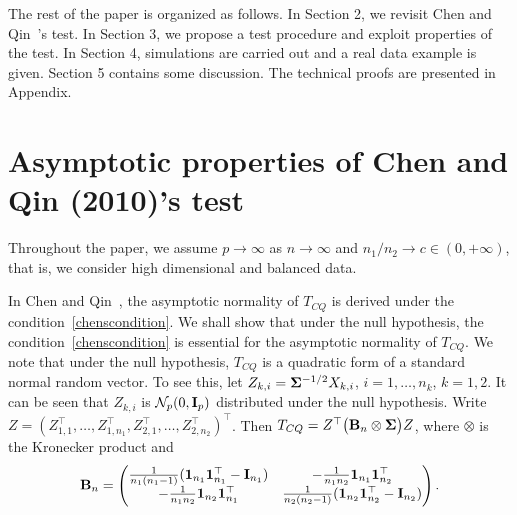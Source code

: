 \documentclass[times,sort&compress,3p]{elsarticle}
\theoremstyle{plain}
\theoremstyle{definition}
\theoremstyle{remark}
\begin{document}
The rest of the paper is organized as follows. In Section 2,  we revisit Chen and Qin~\cite{Chen2010A}'s test.  In Section 3, we propose a test procedure and exploit properties of the test.  In Section 4, simulations are carried out and  a real data example is given. Section 5 contains some discussion. The technical proofs are presented in Appendix.

\section{Asymptotic properties of Chen and Qin (2010)'s test}\label{sec:chen}
    Throughout the paper, we  assume $p\to \infty$ as $n\to \infty$ and ${n_1}/{n_2}\to c \in (0,+\infty)$, that is, we consider high dimensional and balanced data.


    In Chen and Qin~\cite{Chen2010A}, the asymptotic normality of $T_{CQ}$ is derived under the condition~\eqref{chenscondition}.
    We shall show that under the null hypothesis, the condition~\eqref{chenscondition} is essential for the asymptotic normality of $T_{CQ}$.
We note that under the null hypothesis, $T_{CQ}$ is a quadratic form of a standard normal random vector.
To see this,
let $Z_{k,i}=\boldsymbol{\Sigma}^{-1/2}X_{k,i}$, $i=1,\ldots,n_k$, $k=1,2$.
It can be seen that $Z_{k,i}$ is $ \mathcal{N}_p(0,\mathbf{I}_{p})$ distributed under the null hypothesis.
Write $Z=(Z_{1,1}^\top ,\ldots,Z_{1,n_1}^\top ,Z_{2,1}^\top ,\ldots,Z_{2,n_2}^\top )^\top $.
    Then 
        $
        T_{CQ}=Z^\top  \big( \mathbf{B}_n\otimes \boldsymbol{\Sigma} \big) Z
        $,
    where $\otimes$ is the Kronecker product and
    \begin{equation*}
        \mathbf{B}_n=\begin{pmatrix}
            \frac{1}{n_1(n_1-1)}(\mathbf{1}_{n_1} \mathbf{1}_{n_1}^\top -\mathbf{I}_{n_1})&
            -\frac{1}{n_1 n_2}\mathbf{1}_{n_1} \mathbf{1}_{n_2}^\top \\
            -\frac{1}{n_1 n_2}\mathbf{1}_{n_2} \mathbf{1}_{n_1}^\top &
            \frac{1}{n_2(n_2-1)}( \mathbf{1}_{n_2} \mathbf{1}_{n_2}^\top -\mathbf{I}_{n_2})\\
        \end{pmatrix}.
    \end{equation*}
    
\end{document}
